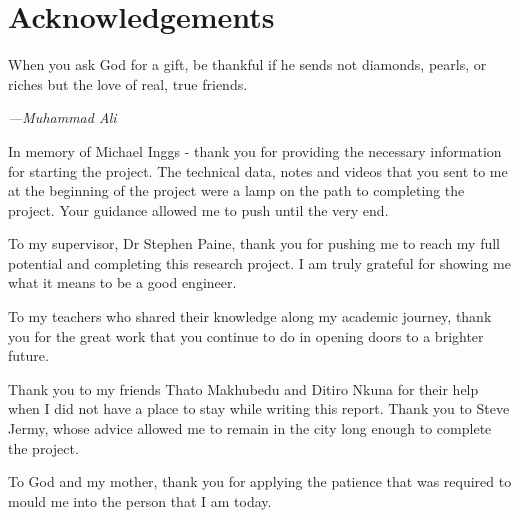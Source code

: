 \documentclass[class=report,11pt,crop=false]{standalone}
\begin{document}
\chapter*{Acknowledgements}
\epigraph{When you ask God for a gift, be thankful if he sends not diamonds, pearls, or riches but the love of real, true friends.}%
    {\emph{---Muhammad Ali}}
\vspace{0.3cm}

In memory of Michael Inggs - thank you for providing the necessary information for starting the project. The technical data, notes and videos that you sent to me at the beginning of the project were a lamp on the path to completing the project. Your guidance allowed me to push until the very end.

To my supervisor, Dr Stephen Paine, thank you for pushing me to reach my full potential and completing this research project. I am truly grateful for showing me what it means to be a good engineer. 

To my teachers who shared their knowledge along my academic journey, thank you for the great work that you continue to do in opening doors to a brighter future. 

Thank you to my friends Thato Makhubedu and Ditiro Nkuna for their help when I did not have a place to stay while writing this report. Thank you to Steve Jermy, whose advice allowed me to remain in the city long enough to complete the project.

To God and my mother, thank you for applying the patience that was required to mould me into the person that I am today. 
\end{document}
